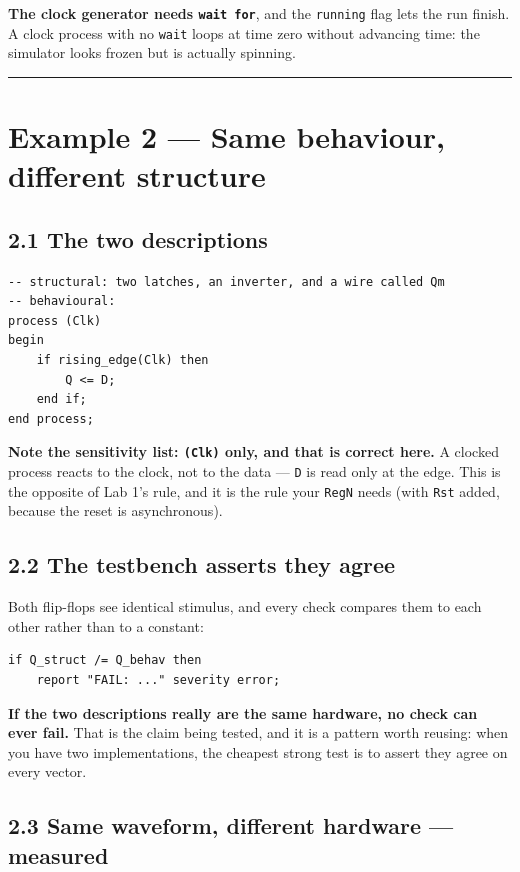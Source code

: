 \documentclass[11pt]{article}
\newcommand{\code}[1]{\texttt{#1}}
\newcommand{\hr}{\vspace{2pt}\hrule\vspace{6pt}}
\begin{document}
\textbf{The clock generator needs \code{wait for}}, and the \code{running} flag
lets the run finish. A clock process with no \code{wait} loops at time zero
without advancing time: the simulator looks frozen but is actually spinning.

\vspace{4pt}\hr

\section*{Example 2 --- Same behaviour, different structure}

\subsection*{2.1 The two descriptions}

\begin{lstlisting}
-- structural: two latches, an inverter, and a wire called Qm
-- behavioural:
process (Clk)
begin
    if rising_edge(Clk) then
        Q <= D;
    end if;
end process;
\end{lstlisting}

\textbf{Note the sensitivity list: \code{(Clk)} only, and that is correct here.} A
clocked process reacts to the clock, not to the data --- \code{D} is read only at
the edge. This is the opposite of Lab 1's rule, and it is the rule your
\code{RegN} needs (with \code{Rst} added, because the reset is asynchronous).

\subsection*{2.2 The testbench asserts they agree}

Both flip-flops see identical stimulus, and every check compares them to each
other rather than to a constant:

\begin{lstlisting}
if Q_struct /= Q_behav then
    report "FAIL: ..." severity error;
\end{lstlisting}

\textbf{If the two descriptions really are the same hardware, no check can ever
fail.} That is the claim being tested, and it is a pattern worth reusing: when you
have two implementations, the cheapest strong test is to assert they agree on
every vector.

\subsection*{2.3 Same waveform, different hardware --- measured}
\end{document}
